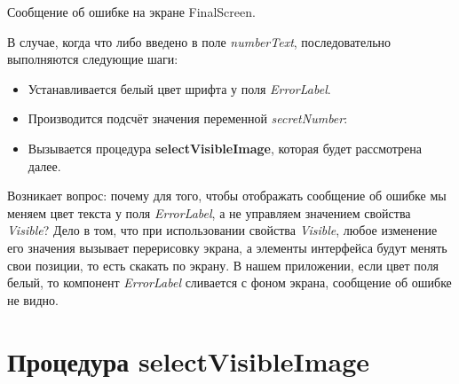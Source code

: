 \begin{enumerate}
\begin{marginfigure}[-2em]
      \caption[Сообщение об ошибке на экране FinalScreen.]{Сообщение об ошибке на экране FinalScreen.}
    \label{fig:block:final:screen:error}
  \end{marginfigure}
  В случае, когда что либо введено в поле \textit{numberText}, последовательно выполняются следующие шаги:
  \begin{itemize}
    \item Устанавливается белый цвет шрифта у поля \textit{ErrorLabel}.
    \item Производится подсчёт значения переменной \textit{secretNumber}:
    \item Вызывается процедура \textbf{selectVisibleImage}, которая будет рассмотрена далее.
  \end{itemize}
\end{enumerate}
Возникает вопрос: почему для того, чтобы отображать сообщение об ошибке мы меняем цвет текста у поля \textit{ErrorLabel}, а не управляем значением свойства \textit{Visible}? 
Дело в том, что при использовании свойства \textit{Visible}, любое изменение его значения вызывает перерисовку экрана, а элементы интерфейса будут менять свои позиции, то есть скакать по экрану.
В нашем приложении, если цвет поля белый, то компонент \textit{ErrorLabel} сливается с фоном экрана, сообщение об ошибке не видно.
\section{Процедура selectVisibleImage}

